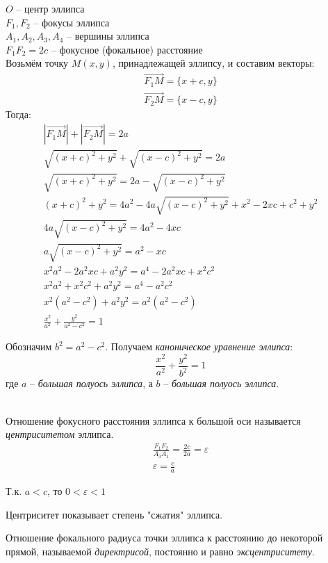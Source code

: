 $O$ -- центр эллипса \\
 $F_1, F_2$ -- фокусы эллипса \\
 $A_1, A_2, A_3, A_4$ -- вершины эллипса \\
$F_1F_2 = 2c$  -- фокусное (фокальное) расстояние\\
Возьмём точку $M(x, y)$, принадлежащей эллипсу, и составим векторы:
\begin{gather*}
  \overrightarrow{F_1M} = \{x + c, y\} \\
  \overrightarrow{F_2M} = \{x - c, y\}
\end{gather*}
Тогда:
\begin{gather*}
  |\overrightarrow{F_1M}| + |\overrightarrow{F_2M}| = 2a \\
  \sqrt{(x + c)^2 + y^2} + \sqrt{(x - c)^2 + y^2} = 2a \\
  \sqrt{(x + c)^2 + y^2} = 2a - \sqrt{(x - c)^2 + y^2} \\
  (x + c)^2 + y^2 = 4a^2 - 4a\sqrt{(x - c)^2 + y^2} + x^2 - 2xc + c^2 + y^2 \\
  4a\sqrt{(x - c)^2 + y^2} = 4a^2 - 4xc \\
  a\sqrt{(x - c)^2 + y^2} = a^2 - xc \\
  x^2 a^2 - 2a^2xc + a^2y^2 = a^4 - 2a^2xc + x^2c^2 \\
  x^2a^2 + x^2c^2 + a^2y^2 = a^4 - a^2c^2 \\
  x^2(a^2 - c^2) + a^2y^2 = a^2(a^2 - c^2) \\
  \frac{x^2}{a^2} + \frac{y^2}{a^2 - c^2} = 1
\end{gather*} 

Обозначим $b^2 = a^2 - c^2$. Получаем \textit{каноническое уравнение эллипса}: \[
  \boxed{\frac{x^2}{a^2} + \frac{y^2}{b^2} = 1}
\]  
где $a$ -- \textit{большая полуось эллипса}, а  $b$ -- \textit{большая полуось эллипса}.


\\
Отношение фокусного расстояния эллипса к большой оси называется \textit{центриситетом} эллипса. 
\begin{gather*}
  \frac{F_1F_2}{A_3A_1} = \frac{2c}{2a} = \varepsilon \\
  \boxed{\varepsilon = \frac{c}{a}}
\end{gather*}
\begin{note}
  Т.к. $a < c$, то $0 < \varepsilon < 1$
\end{note}

Центриситет показывает степень "сжатия" эллипса.

Отношение фокального радиуса точки эллипса к расстоянию до некоторой прямой, называемой \textit{директрисой}, постоянно и равно \textit{эксцентриситету}. 

